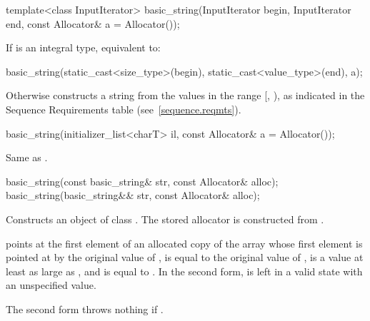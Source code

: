 %
\begin{itemdecl}
template<class InputIterator>
  basic_string(InputIterator begin, InputIterator end, const Allocator& a = Allocator());
\end{itemdecl}

\begin{itemdescr}
\pnum
\effects
If  is an integral type,
equivalent to:
\begin{codeblock}
basic_string(static_cast<size_type>(begin), static_cast<value_type>(end), a);
\end{codeblock}
Otherwise constructs a string from the values in the range [, ),
as indicated in the Sequence Requirements table
(see~\ref{sequence.reqmts}).
%
\end{itemdescr}

%
\begin{itemdecl}
basic_string(initializer_list<charT> il, const Allocator& a = Allocator());
\end{itemdecl}

\begin{itemdescr}
\pnum
\effects Same as .
\end{itemdescr}

%
\begin{itemdecl}
basic_string(const basic_string& str, const Allocator& alloc);
basic_string(basic_string&& str, const Allocator& alloc);
\end{itemdecl}

\begin{itemdescr}
\pnum
\effects Constructs an object of class .
The stored allocator is constructed from .

\pnum
\postconditions
{} points at the first element of an allocated copy
of the array whose first element is pointed at by the original
value of ,  is equal to the
original value of ,  is a value
at least as large as , and  is
equal to .
In the second form,  is left in a valid state with an
unspecified value.

\pnum
\throws The second form throws nothing if .
\end{itemdescr}

